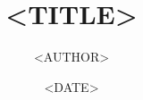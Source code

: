 \documentclass[aspectratio=169]{beamer}
\title{<TITLE>}
\author{<AUTHOR>}
\institute{<INSTITUTE>}
\date{<DATE>}
\begin{document}
\frame{\titlepage}
\end{document}
